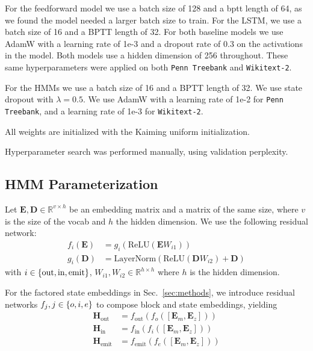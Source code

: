 \documentclass[11pt,a4paper]{article}
\begin{document}
For the feedforward model we use a batch size of 128 and a bptt length of 64, as we found the model needed a larger batch size to train.
For the LSTM, we use a batch size of 16 and a BPTT length of 32.
For both baseline models we use AdamW \citep{adamw} with a learning rate of 1e-3 and a dropout rate of 0.3 on the activations in the model.
Both models use a hidden dimension of 256 throughout.
These same hyperparameters were applied on both \texttt{Penn Treebank} and \texttt{Wikitext-2}.

For the HMMs we use a batch size of 16 and a BPTT length of 32.
We use state dropout with $\lambda = 0.5$.
We use AdamW \citep{adamw} with a learning rate of 1e-2 for \texttt{Penn Treebank},
and a learning rate of 1e-3 for \texttt{Wikitext-2}.

All weights are initialized with the Kaiming uniform initialization.

Hyperparameter search was performed manually, using validation perplexity.

\subsection{HMM Parameterization}
Let $\mathbf{E},\mathbf{D}\in\mathbb{R}^{v \times h}$ be an
embedding matrix and a matrix of the same size,
where $v$ is the size of the vocab and $h$ the hidden dimension.
We use the following residual network:
\begin{equation}
\label{eqn:res}
\begin{aligned}
f_i(\mathbf{E}) &= g_i(\textrm{ReLU}(\mathbf{E}W_{i1}))\\
g_i(\mathbf{D}) &= \textrm{LayerNorm}(\textrm{ReLU}(\mathbf{D}W_{i2}) + \mathbf{D})
\end{aligned}
\end{equation}
with $i \in \left\{\textrm{out},\textrm{in},\textrm{emit}\right\}$,
$W_{i1},W_{i2} \in \mathbb{R}^{h \times h}$
where $h$ is the hidden dimension.

For the factored state embeddings in Sec.~\ref{sec:methods}, we
introduce residual networks $f_j,j\in\left\{o,i,e\right\}$
to compose block and state embeddings, yielding
\begin{equation}
\begin{aligned}
\mathbf{H}_\textrm{out} &= f_\textrm{out}(f_o([\mathbf{E}_m,\mathbf{E}_z]))\\
\mathbf{H}_\textrm{in} &= f_\textrm{in}(f_i([\mathbf{E}_m,\mathbf{E}_z]))\\
\mathbf{H}_\textrm{emit} &= f_\textrm{emit}(f_e([\mathbf{E}_m,\mathbf{E}_z]))
\end{aligned}
\end{equation}
\end{document}
